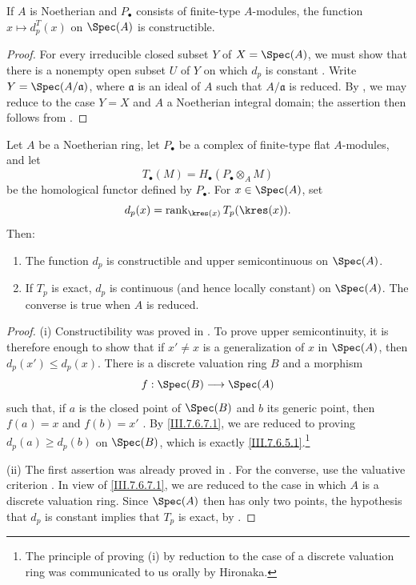 \begin{lemma}[7.6.8]
\label{III.7.6.8}
If $A$ is Noetherian and $P_\bullet$ consists of finite-type
$A$-modules, the function $x\mapsto d_p^T(x)$ on $\Spec(A)$
is constructible.
\end{lemma}

\begin{proof}
For every irreducible closed subset $Y$ of
$X=\Spec(A)$, we must show that there is a nonempty open
subset $U$ of $Y$ on which $d_p$ is constant
.  Write $Y=\Spec(A/\mathfrak a)$, where
$\mathfrak a$ is an ideal of $A$ such that
$A/\mathfrak a$ is reduced.  By , we may
reduce to the case $Y=X$ and $A$ a Noetherian integral
domain; the assertion then follows from .
\end{proof}

\begin{theorem}[7.6.9]
\label{III.7.6.9}
Let $A$ be a Noetherian ring, let $P_\bullet$ be a complex of
finite-type flat $A$-modules, and let
\[
  T_\bullet(M)=H_\bullet(P_\bullet\otimes_A M)
\]
be the homological functor defined by $P_\bullet$.  For
$x\in\Spec(A)$, set
\[
  d_p(x)=\operatorname{rank}_{\kres(x)}T_p(\kres(x)).
\]
Then:
\begin{enumerate}
  \item[(i)] The function $d_p$ is constructible and upper
    semicontinuous on $\Spec(A)$.
  \item[(ii)] If $T_p$ is exact, $d_p$ is continuous (and
    hence locally constant) on $\Spec(A)$.  The converse is
    true when $A$ is reduced.
\end{enumerate}
\end{theorem}

\begin{proof}
\textnormal{(i)}
Constructibility was proved in .  To prove
upper semicontinuity, it is therefore enough
 to show that if $x'\neq x$ is a
generalization of $x$ in $\Spec(A)$, then
$d_p(x')\leq d_p(x)$.  There is a discrete valuation ring
$B$ and a morphism
\[
  f:\Spec(B)\longrightarrow\Spec(A)
\]
such that, if $a$ is the closed point of $\Spec(B)$ and $b$
its generic point, then $f(a)=x$ and $f(b)=x'$
.  By \eqref{III.7.6.7.1}, we are reduced
to proving $d_p(a)\geq d_p(b)$ on $\Spec(B)$, which is exactly
\eqref{III.7.6.5.1}.\footnote{The principle of proving
\textnormal{(i)} by reduction to the case of a discrete
valuation ring was communicated to us orally by Hironaka.}

\medskip
\textnormal{(ii)}
The first assertion was already proved in
.  For the converse, use the valuative
criterion .  In view of
\eqref{III.7.6.7.1}, we are reduced to the case in which $A$
is a discrete valuation ring.  Since $\Spec(A)$ then has only
two points, the hypothesis that $d_p$ is constant implies
that $T_p$ is exact, by .
\end{proof}

